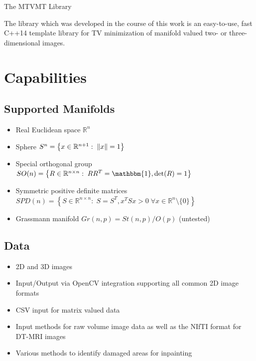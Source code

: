 \begin{chapter}{The MTVMT Library}
\label{ch:library}

The library which was developed in the course of this work is an easy-to-use, fast C++14 template library for TV minimization of manifold valued two- or three-dimensional images.

\section{Capabilities} %
\label{sec:Capabilities}
\subsection{Supported Manifolds} %
\label{sub:Supported Manifolds}
\begin{itemize}
    \item Real Euclidean space $\mathbb{R}^n$
    \item Sphere $S^n=\left\lbrace x\in\mathbb{R}^{n+1}:\; \| x \|=1\right\rbrace$
    \item Special orthogonal group $SO(n)=\left\lbrace R\in\mathbb{R}^{n\times n}:\; RR^T=\mathbbm{1}, \operatorname{det}(R)=1 \right\rbrace$
    \item Symmetric positive definite matrices $SPD(n)=\left\lbrace S\in\mathbb{R}^{n\times n}:\; S=S^T, x^TSx>0\; \forall x\in\mathbb{R}^n\setminus\lbrace 0\rbrace \right\rbrace$
    \item Grassmann manifold $Gr(n,p) = St(n,p) / O(p)$ (untested)
\end{itemize}

\subsection{Data} %
\label{sub:Data}
\begin{itemize}
	\item 2D and 3D images
	\item Input/Output via OpenCV integration supporting all common 2D image formats
	\item CSV input for matrix valued data
	\item Input methods for raw volume image data as well as the NIfTI \cite{nifti} format for DT-MRI images
	\item Various methods to identify damaged areas for inpainting
\end{itemize}


\end{chapter}
